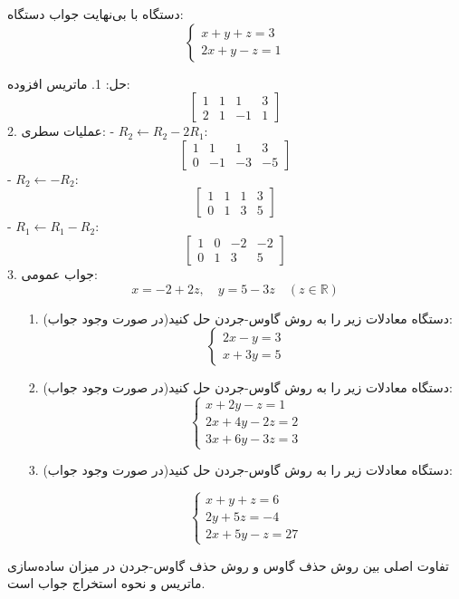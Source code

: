 \begin{example}[]
	دستگاه با بی‌نهایت جواب
	دستگاه:
	\[
	\begin{cases}
		x + y + z = 3 \\
		2x + y - z = 1
	\end{cases}
	\]
	
	حل:
	1. ماتریس افزوده:
	\[
	\left[
	\begin{array}{ccc|c}
		1 & 1 & 1 & 3 \\
		2 & 1 & -1 & 1
	\end{array}
	\right]
	\]
	2. عملیات سطری:
	- \( R_2 \leftarrow R_2 - 2R_1 \):
	\[
	\left[
	\begin{array}{ccc|c}
		1 & 1 & 1 & 3 \\
		0 & -1 & -3 & -5
	\end{array}
	\right]
	\]
	- \( R_2 \leftarrow -R_2 \):
	\[
	\left[
	\begin{array}{ccc|c}
		1 & 1 & 1 & 3 \\
		0 & 1 & 3 & 5
	\end{array}
	\right]
	\]
	- \( R_1 \leftarrow R_1 - R_2 \):
	\[
	\left[
	\begin{array}{ccc|c}
		1 & 0 & -2 & -2 \\
		0 & 1 & 3 & 5
	\end{array}
	\right]
	\]
	3. جواب عمومی:
	\[
	x = -2 + 2z, \quad y = 5 - 3z \quad (z \in \mathbb{R})
	\]
	
\end{example}
\begin{exercise}

\begin{itemize}
	\item [1. ]
	دستگاه معادلات زیر را  به روش گاوس-جردن حل کنید(در صورت وجود جواب):
	\[
	\begin{cases}
		2x - y = 3 \\
		x + 3y = 5
	\end{cases}
	\]
	\item [2. ]
		دستگاه معادلات زیر را  به روش گاوس-جردن حل کنید(در صورت وجود جواب):
	\[
	\begin{cases}
		x + 2y - z = 1 \\
		2x + 4y - 2z = 2 \\
		3x + 6y - 3z = 3
	\end{cases}
	\]
		
	\item [3. ]
		دستگاه معادلات زیر را  به روش گاوس-جردن حل کنید(در صورت وجود جواب):
		
	\[
	\begin{cases}
		x + y + z = 6 \\
		2y + 5z = -4 \\
		2x + 5y - z = 27
	\end{cases}
	\]
	
\end{itemize}	
\end{exercise} 
\begin{nokteh}
تفاوت اصلی بین روش حذف گاوس 
و روش حذف گاوس-جردن
در میزان ساده‌سازی ماتریس و نحوه استخراج جواب است. 	
\end{nokteh}	

